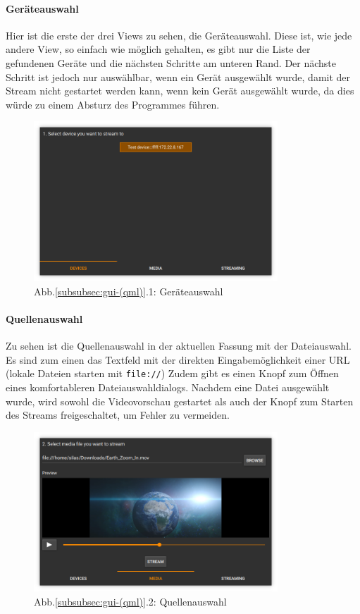 \documentclass{article}
\begin{document}
    \paragraph{Geräteauswahl}
    Hier ist die erste der drei Views zu sehen, die Geräteauswahl.
    Diese ist, wie jede andere View, so einfach wie möglich gehalten,
    es gibt nur die Liste der gefundenen Geräte und die nächsten Schritte am unteren Rand.
    Der nächste Schritt ist jedoch nur auswählbar, wenn ein Gerät ausgewählt wurde,
    damit der Stream nicht gestartet werden kann, wenn kein Gerät ausgewählt wurde,
    da dies würde zu einem Absturz des Programmes führen.
    \begin{figure} [!ht]
        \centering
        \includegraphics[height=6cm]{Devices.png}
        \caption*{Abb.\ref{subsubsec:gui-(qml)}.1: Geräteauswahl}
    \end{figure}

    \paragraph{Quellenauswahl}
    Zu sehen ist die Quellenauswahl in der aktuellen Fassung mit der Dateiauswahl.
    Es sind zum einen das Textfeld mit der direkten Eingabemöglichkeit einer URL (lokale Dateien starten mit \texttt{file://})
    Zudem gibt es einen Knopf zum Öffnen eines komfortableren Dateiauswahldialogs.
    Nachdem eine Datei ausgewählt wurde, wird sowohl die Videovorschau gestartet als auch der Knopf zum Starten des Streams freigeschaltet, um Fehler zu vermeiden.

    \begin{figure} [!ht]
        \centering
        \includegraphics[height=6cm]{Media.png}
        \caption*{Abb.\ref{subsubsec:gui-(qml)}.2: Quellenauswahl}
    \end{figure}
\end{document}
